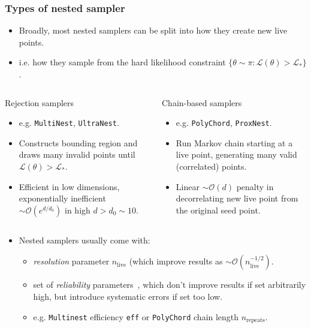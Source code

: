 \documentclass[aspectratio=169]{beamer}
\begin{document}
\begin{frame}
    \frametitle{Types of nested sampler}
    \begin{itemize}
        \item Broadly, most nested samplers can be split into how they create new live points.
        \item i.e. how they sample from the hard likelihood constraint $\{\theta\sim \pi : \mathcal{L}(\theta)>\mathcal{L}_* \}$.
    \end{itemize}
    \vspace{-10pt}
    \begin{columns}[t]
        \begin{block}{Rejection samplers}
            \begin{itemize}
                \item e.g. \texttt{MultiNest}, \texttt{UltraNest}.
                \item Constructs bounding region and draws many invalid points until $\mathcal{L}(\theta)>\mathcal{L}_*$.
                \item Efficient in low dimensions, exponentially inefficient $\sim\mathcal{O}(e^{d/d_0})$ in high  $d>d_0\sim10$.
            \end{itemize}
        \end{block}
        \begin{block}{Chain-based samplers}
            \begin{itemize}
                \item e.g. \texttt{PolyChord}, \texttt{ProxNest}.
                \item Run Markov chain starting at a live point, generating many valid (correlated) points.
                \item Linear $\sim\mathcal{O}(d)$ penalty in decorrelating new live point from the original seed point.
            \end{itemize}
        \end{block}
    \end{columns}
    \vspace{5pt}
    \begin{itemize}
        \item Nested samplers usually come with:
            \begin{itemize}
                \item \emph{resolution} parameter $n_\mathrm{live}$ (which improve results as $\sim\mathcal{O}(n_\mathrm{live}^{-1/2})$.
                    \item set of \emph{reliability} parameters~, which don't improve results if set arbitrarily high, but introduce systematic errors if set too low.
                    \item e.g. \texttt{Multinest} efficiency \texttt{eff} or \texttt{PolyChord} chain length $n_\mathrm{repeats}$.
                \end{itemize}
        \end{itemize}
    \end{frame}
\end{document}
